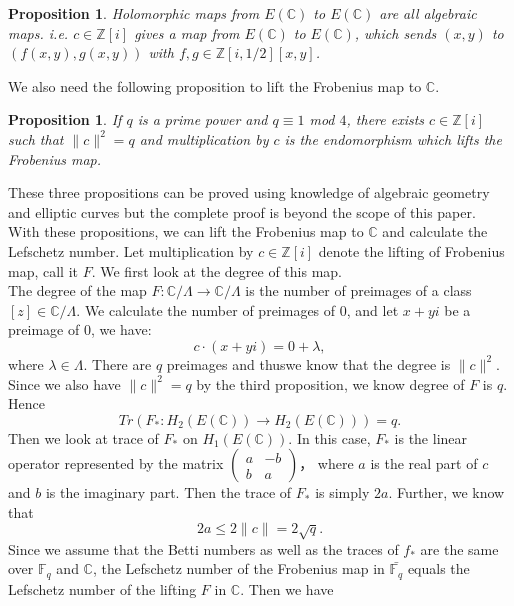 \documentclass[psamsfonts]{amsart}
\newtheorem{prop}[theorem]{Proposition}
\theoremstyle{definition}
\theoremstyle{remark}
\numberwithin{equation}{section}
\begin{document}
	\begin{prop}
		Holomorphic maps from $E(\mathbb{C})$ to $E(\mathbb{C})$ are all algebraic maps. i.e. $c \in \mathbb{Z}[i]$ gives a map from $E(\mathbb{C})$ to $E(\mathbb{C})$, which sends $(x,y)$ to $(f(x,y),g(x,y))$ with $f,g \in \mathbb{Z}[i,1/2][x,y]$.
	\end{prop}
		We also need the following proposition to lift the Frobenius map to $\mathbb{C}$.
	\begin{prop}
		If $q$ is a prime power and $q \equiv 1$ mod $4$, there exists $c \in \mathbb{Z}[i]$ such that $\| c \|^2 = q$ and multiplication by $c$ is the endomorphism which lifts the Frobenius map.
	\end{prop}
	These three propositions can be proved using knowledge of algebraic geometry and elliptic curves but the complete proof is beyond the scope of this paper.\\ 
	\indent With these propositions, we can lift the Frobenius map to $\mathbb{C}$ and calculate the Lefschetz number. Let multiplication by $c \in \mathbb{Z}[i]$ denote the lifting of Frobenius map, call it $F$. We first look at the degree of this map.\\
	\indent The degree of the map $F: \mathbb{C} / \Lambda \to \mathbb{C} / \Lambda$ is the number of preimages of a class $[z] \in \mathbb{C} / \Lambda$. We calculate the number of preimages of $0$, and let $x+yi$ be a preimage of $0$, we have:
	\begin{equation}
		c \cdot (x+yi) = 0 + \lambda,
	\end{equation}
	where $\lambda \in \Lambda$. There are $q$ preimages and thuswe know that the degree is $\| c \|^2$.
	Since we also have $\|  c \|^2 = q$ by the third proposition, we know degree of $F$ is $q$. Hence 
	\begin{equation}
		Tr(F_* : H_2(E(\mathbb{C})) \to H_2(E(\mathbb{C}))) = q.
	\end{equation}
	Then we look at trace of $F_*$ on $H_1(E(\mathbb{C}))$. In this case, $F_*$ is the linear operator represented by the matrix
	$\begin{pmatrix}
		a & -b \\
		b & a
	\end{pmatrix}$， where $a$ is the real part of $c$ and $b$ is the imaginary part. Then the trace of $F_*$ is simply $2a$. Further, we know that
	\begin{equation}
		2a \leq 2\| c \|  = 2\sqrt{q}.
	\end{equation}
	Since we assume that the Betti numbers as well as the traces of $f_*$ are the same over $\mathbb{F}_q$ and $\mathbb{C}$, the Lefschetz number of the Frobenius map in $\bar{\mathbb{F}_q}$ equals the Lefschetz number of the lifting $F$ in $\mathbb{C}$. Then we have
\end{document}
